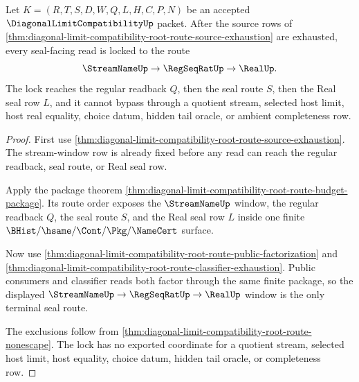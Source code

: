 \begin{theorem}
\label{thm:diagonal-limit-compatibility-root-route-seal-window-lock}
Let $K=(R,T,S,D,W,Q,L,H,C,P,N)$ be an accepted $\DiagonalLimitCompatibilityUp$ packet. After the source rows of \autoref{thm:diagonal-limit-compatibility-root-route-source-exhaustion} are exhausted, every seal-facing read is locked to the route
$$
\StreamNameUp \to \RegSeqRatUp \to \RealUp.
$$
The lock reaches the regular readback $Q$, then the seal route $S$, then the Real seal row $L$, and it cannot bypass through a quotient stream, selected host limit, host real equality, choice datum, hidden tail oracle, or ambient completeness row.
\end{theorem}
\begin{proof}
First use \autoref{thm:diagonal-limit-compatibility-root-route-source-exhaustion}. The stream-window row is already fixed before any read can reach the regular readback, seal route, or Real seal row.

Apply the package theorem \autoref{thm:diagonal-limit-compatibility-root-route-budget-package}. Its route order exposes the $\StreamNameUp$ window, the regular readback $Q$, the seal route $S$, and the Real seal row $L$ inside one finite $\BHist/\hsame/\Cont/\Pkg/\NameCert$ surface.

Now use \autoref{thm:diagonal-limit-compatibility-root-route-public-factorization} and \autoref{thm:diagonal-limit-compatibility-root-route-classifier-exhaustion}. Public consumers and classifier reads both factor through the same finite package, so the displayed $\StreamNameUp \to \RegSeqRatUp \to \RealUp$ window is the only terminal seal route.

The exclusions follow from \autoref{thm:diagonal-limit-compatibility-root-route-nonescape}. The lock has no exported coordinate for a quotient stream, selected host limit, host equality, choice datum, hidden tail oracle, or completeness row.
\end{proof}

